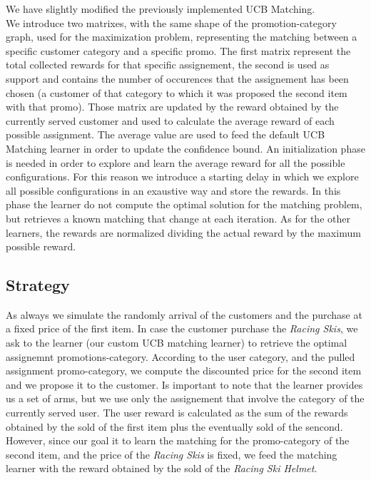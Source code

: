 We have slightly modified the previously implemented UCB Matching. \\
We introduce two matrixes, with the same shape of the promotion-category graph, used for the maximization problem, representing the matching between a specific customer category and a specific promo. The first matrix represent the total collected rewards for that specific assignement, the second is used as support and contains the number of occurences that the assignement has been chosen (a customer of that category to which it was proposed the second item with that promo). 
Those matrix are updated by the reward obtained by the currently served customer and used to calculate the average reward of each possible assignment. The average value are used to feed the default UCB Matching learner in order to update the confidence bound.
An initialization phase is needed in order to explore and learn the average reward for all the possible configurations. For this reason we introduce a starting delay in which we explore all possible configurations in an exaustive way and store the rewards. In this phase the learner do not compute the optimal solution for the matching problem, but retrieves a known matching that change at each iteration.
As for the other learners, the rewards are normalized dividing the actual reward by the maximum possible reward.

\subsection*{Strategy}

As always we simulate the randomly arrival of the customers and the purchase at a fixed price of the first item. In case the customer purchase the \textit{Racing Skis}, we ask to the learner (our custom UCB matching learner) to retrieve the optimal assignemnt promotions-category. According to the user category, and the pulled assignment promo-category, we compute the discounted price for the second item and we propose it to the customer. Is important to note that the learner provides us a set of arms, but we use only the assignement that involve the category of the currently served user. The user reward is calculated as the sum of the rewards obtained by the sold of the first item plus the eventually sold of the sencond. However, since our goal it to learn the matching for the promo-category of the second item, and the price of the \textit{Racing Skis} is fixed, we feed the matching learner with the reward obtained by the sold of the \textit{Racing Ski Helmet}. 

